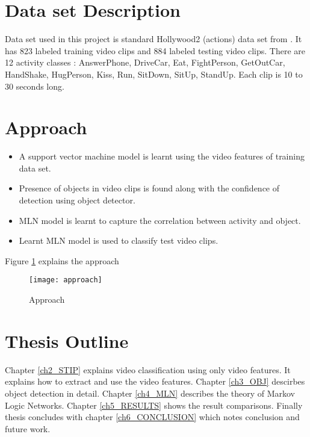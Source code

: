 \section{Data set Description}
Data set used in this project is standard Hollywood2 (actions) data set from \cite{actionsInContext}. 
It has 823 labeled training video clips and 884 labeled testing video clips. 
There are 12 activity classes : AnswerPhone, DriveCar, Eat, FightPerson,
 GetOutCar, HandShake, HugPerson, Kiss, Run, SitDown, SitUp, StandUp.
 Each clip is 10 to 30 seconds long.


\section{Approach}
\begin{itemize}
	\item A support vector machine model is learnt using the video features of training data set. 
	\item Presence of objects in video clips is found along with the confidence of detection using object detector. 
	\item MLN model is learnt to capture the correlation between activity and object.
	\item Learnt MLN model is used to classify test video clips.
\end{itemize}

Figure \ref{fig:approach} explains the approach
\begin{figure}[H]
\begin{center}	
\texttt{[image: approach]} 
\caption{Approach}
\label{fig:approach}
\end{center}
\end{figure}


\section{Thesis Outline}
Chapter \ref{ch2_STIP} explains video classification using only video features. It explains how to extract and use the video features. 
Chapter \ref{ch3_OBJ} descirbes object detection in detail. 
Chapter \ref{ch4_MLN} describes the theory of Markov Logic Networks. 
Chapter \ref{ch5_RESULTS} shows the result comparisons.
Finally thesis concludes with chapter \ref{ch6_CONCLUSION} which notes conclusion and future work.

\begin{comment}
\begin{table}
\centering
\begin{tabular}{| c | c |}
\hline
{\bf item 1} & {\bf item 2} \\ \hline
%
abcde & 5 \\ \hline
%
pqrst & 4 \\ \hline
\end{tabular}
\caption{A sample table}
\label{table:1}
\end{table}
\end{comment}


